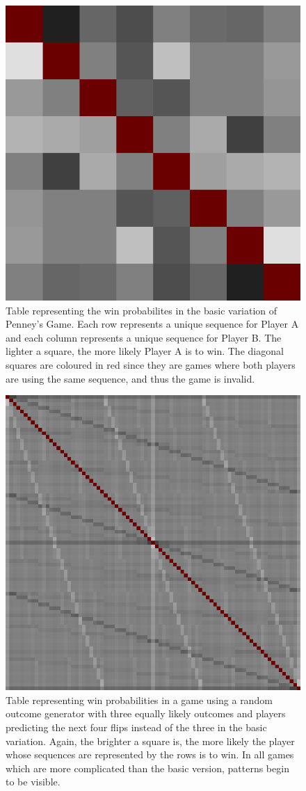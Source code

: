 \documentclass[english,12pt,a4paper,final]{article}
\begin{document}
\begin{figure}[H]
	\centering
	\includegraphics[width=0.5\linewidth]{s2k3}
	\caption{Table representing the win probabilites in the basic variation of Penney's Game. Each row represents a unique sequence for Player A and each column represents a unique sequence for Player B. The lighter a square, the more likely Player A is to win. The diagonal squares are coloured in red since they are games where both players are using the same sequence, and thus the game is invalid.}
	\label{fig:s2k3}
\end{figure}

\begin{figure} [H]
	\centering
	\includegraphics[width=0.5\linewidth]{s3k4}
	\caption{Table representing win probabilities in a game using a random outcome generator with three equally likely outcomes and players predicting the next four flips instead of the three in the basic variation. Again, the brighter a square is, the more likely the player whose sequences are represented by the rows is to win. In all games which are more complicated than the basic version, patterns begin to be visible.}
	\label{fig:s3k4}
\end{figure}
\end{document}

